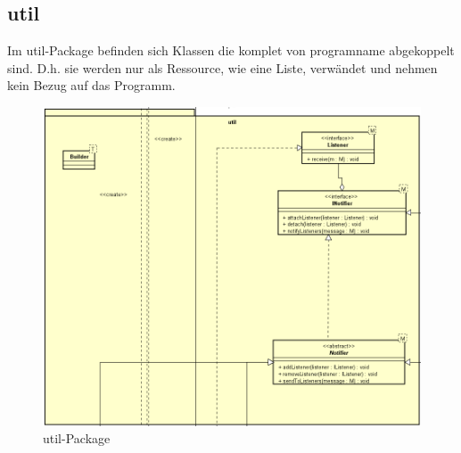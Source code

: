 \subsection{util}
\label{subsec:util}

Im util-Package befinden sich Klassen die komplet von \gls{programname} abgekoppelt
sind. D.h. sie werden nur als Ressource, wie eine Liste, verwändet und nehmen kein
Bezug auf das Programm.

\begin{figure}[H]
  \centering
  \includegraphics[width=\textwidth]{../diagramimages/util.png}
  \caption{util-Package}
\end{figure}

